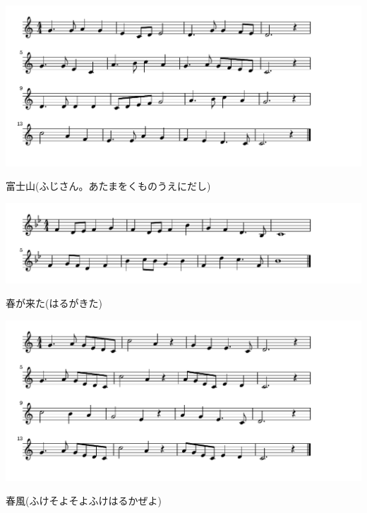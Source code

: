 \documentclass[a4paper]{ltjsarticle}
\begin{document}
\vspace{10mm}

\includegraphics[clip]{fujisan_crop.pdf}

\vspace{-10mm}

\parindent=50pt 
富士山(ふじさん。あたまをくものうえにだし)
\parindent=10pt

\vspace{10mm}

\includegraphics[clip]{harugakita_crop.pdf}

\vspace{-10mm}

\parindent=50pt 
春が来た(はるがきた)
\parindent=10pt

\vspace{10mm}

\includegraphics[clip]{harukaze_crop.pdf}

\vspace{-10mm}

\parindent=50pt 
春風(ふけそよそよふけはるかぜよ)
\parindent=10pt
\end{document}

